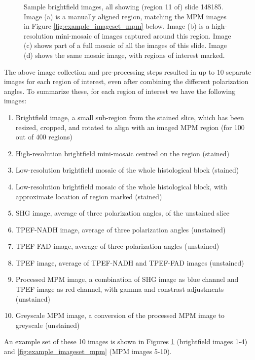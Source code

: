 \documentclass{report}
\begin{document}
\begin{figure}
\caption{Sample brightfield images, all showing (region 11 of) slide 148185. Image (a) is a manually aligned region, matching the MPM images in Figure \ref{fig:example_imageset_mpm} below. Image (b) is a high-resolution mini-mosaic of images captured around this region. Image (c) shows part of a full mosaic of all the images of this slide. Image (d) shows the same mosaic image, with regions of interest marked.}
\label{fig:example_imageset_bf}
\end{figure}

The above image collection and pre-processing steps resulted in up to 10 separate images for each region of interest, even after combining the different polarization angles. To summarize these, for each region of interest we have the following images:
\begin{enumerate}
\item Brightfield image, a small sub-region from the stained slice, which has been resized, cropped, and rotated to align with an imaged MPM region (for 100 out of 400 regions)
\label{data:manual_bf}
\item High-resolution brightfield mini-mosaic centred on the region (stained)
\item Low-resolution brightfield mosaic of the whole histological block (stained)
\item Low-resolution brightfield mosaic of the whole histological block, with approximate location of region marked (stained)
\item SHG image, average of three polarization angles, of the unstained slice
\label{data:shg}
\item TPEF-NADH image, average of three polarization angles (unstained)
\item TPEF-FAD image, average of three polarization angles (unstained)
\item TPEF image, average of TPEF-NADH and TPEF-FAD images (unstained)
\label{data:tpef}
\item Processed MPM image, a combination of SHG image as blue channel and TPEF image as red channel, with gamma and constrast adjustments (unstained)
\item Greyscale MPM image, a conversion of the processed MPM image to greyscale (unstained)
\label{data:reprocessed_mpm}
\end{enumerate}
An example set of these 10 images is shown in Figures \ref{fig:example_imageset_bf} (brightfield images 1-4) and \ref{fig:example_imageset_mpm} (MPM images 5-10).
\end{document}
